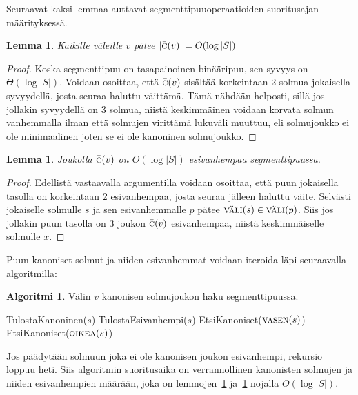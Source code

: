 \documentclass[finnish]{tktltiki2}
\newtheorem{lem}[lau]{Lemma}
\theoremstyle{definition}
\newtheorem{alg}[lau]{Algoritmi}
\theoremstyle{remark}
\newcommand\size[1]{\ensuremath{\left |#1\right |}\xspace}
\newcommand\epts{\ensuremath{S}\xspace}
\newcommand\inter[1]{\ensuremath{\textsc{väli}(#1)}\xspace}
\newcommand\leftc[1]{\ensuremath{\textsc{vasen}(#1)}\xspace}
\newcommand\rightc[1]{\ensuremath{\textsc{oikea}(#1)}\xspace}
\newcommand\canon[1]{\ensuremath{\bar{\textsc{c}}(#1)}\xspace}
\begin{document}
Seuraavat kaksi lemmaa auttavat segmenttipuuoperaatioiden suoritusajan määrityksessä.

\begin{lem}\label{kanonlog}Kaikille väleille $v$ pätee $\size{\canon{v}}=O(\log\size{\epts})$\end{lem}
\begin{proof}
Koska segmenttipuu on tasapainoinen binääripuu, sen syvyys on $\Theta(\log\size{\epts})$.
Voidaan osoittaa, että $\canon{v}$ sisältää korkeintaan 2 solmua jokaisella syvyydellä, josta seuraa haluttu väittämä.
Tämä nähdään helposti, sillä jos jollakin syvyydellä on 3 solmua, niistä keskimmäinen voidaan korvata solmun vanhemmalla ilman että solmujen virittämä lukuväli muuttuu, eli solmujoukko ei ole minimaalinen joten se ei ole kanoninen solmujoukko.
\end{proof}

\begin{lem}\label{kanonplog}Joukolla $\canon{v}$ on $O(\log\size{\epts})$ esivanhempaa segmenttipuussa.\end{lem}
\begin{proof}
Edellistä vastaavalla argumentilla voidaan osoittaa, että puun jokaisella tasolla on korkeintaan 2 esivanhempaa, josta seuraa jälleen haluttu väite.
Selvästi jokaiselle solmulle $s$ ja sen esivanhemmalle $p$ pätee $\inter{s}\in\inter{p}$.
Siis jos jollakin puun tasolla on 3 joukon $\canon{v}$ esivanhempaa, niistä keskimmäiselle solmulle $x$.
\end{proof}

Puun kanoniset solmut ja niiden esivanhemmat voidaan iteroida läpi seuraavalla algoritmilla:

\begin{alg}\label{alg:seghaku}
Välin $v$ kanonisen solmujoukon haku segmenttipuussa.
\begin{algorithmic}
	\If{$\inter{s}\subseteq v$}
		\State TulostaKanoninen($s$)
	\ElsIf{$\inter{s}\cap v\neq\emptyset$}
		\State TulostaEsivanhempi($s$)
		\State EtsiKanoniset($\leftc{s}$)
		\State EtsiKanoniset($\rightc{s}$)
	\EndIf
\EndProcedure
\end{algorithmic}
\end{alg}

Jos päädytään solmuun joka ei ole kanonisen joukon esivanhempi, rekursio loppuu heti.
Siis algoritmin suoritusaika on verrannollinen kanonisten solmujen ja niiden esivanhempien määrään, joka on lemmojen~\ref{kanonlog} ja~\ref{kanonplog} nojalla $O(\log\size{\epts})$.
\end{document}
